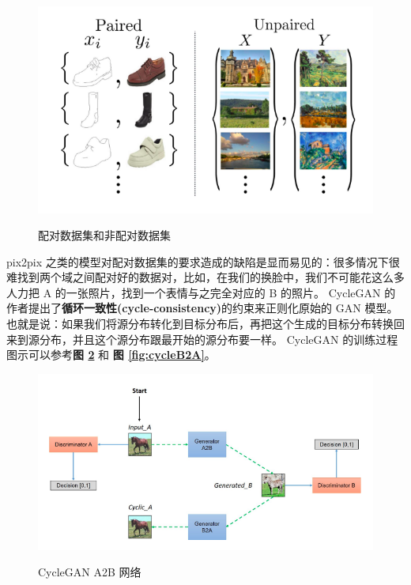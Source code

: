 \begin{figure}[h!]
	\caption{配对数据集和非配对数据集}
	\centering
	\includegraphics[width=\textwidth]{figure/resources/unpaired.png}
	\label{fig:unpaired}
\end{figure}

pix2pix 之类的模型对配对数据集的要求造成的缺陷是显而易见的：很多情况下很难找到两个域之间配对好的数据对，比如，在我们的换脸中，我们不可能花这么多人力把 A 的一张照片，找到一个表情与之完全对应的 B 的照片。
CycleGAN 的作者提出了\textbf{循环一致性(cycle-consistency)}的约束来正则化原始的 GAN 模型。
也就是说：如果我们将源分布转化到目标分布后，再把这个生成的目标分布转换回来到源分布，并且这个源分布跟最开始的源分布要一样。
CycleGAN 的训练过程图示可以参考\textbf{图 \ref{fig:cycleA2B}} 和 \textbf{图 \ref{fig:cycleB2A}}。

\begin{figure}[h!]
	\caption{CycleGAN A2B 网络}
	\centering
	\includegraphics[width=\textwidth]{figure/resources/cycleA2B.png}
	\label{fig:cycleA2B}
\end{figure}

